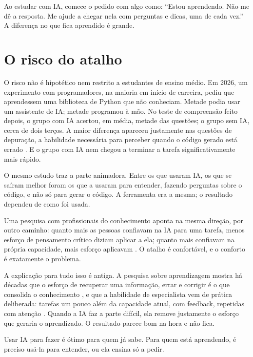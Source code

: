 \begin{dica}
Ao estudar com IA, comece o pedido com algo como: \enquote{Estou aprendendo. Não me dê a
resposta. Me ajude a chegar nela com perguntas e dicas, uma de cada vez.} A diferença no
que fica aprendido é grande.
\end{dica}

\section{O risco do atalho}
\label{sec:risco-atalho}

O risco não é hipotético nem restrito a estudantes de ensino médio. Em 2026, um experimento
com programadores, na maioria em início de carreira, pediu que aprendessem uma biblioteca de
Python que não conheciam. Metade podia usar um assistente de IA; metade programou à mão. No
teste de compreensão feito depois, o grupo com IA acertou, em média, metade das questões;
o grupo sem IA, cerca de dois terços. A maior diferença apareceu justamente nas questões de
depuração, a habilidade necessária para perceber quando o código gerado está errado
\parencite{shen2026}. E o grupo com IA nem chegou a terminar a tarefa significativamente
mais rápido.

O mesmo estudo traz a parte animadora. Entre os que usaram IA, os que se saíram melhor
foram os que a usaram para entender, fazendo perguntas sobre o código, e não só para gerar
o código. A ferramenta era a mesma; o resultado dependeu de como foi usada.

Uma pesquisa com profissionais do conhecimento aponta na mesma direção, por outro caminho:
quanto mais as pessoas confiavam na IA para uma tarefa, menos esforço de pensamento crítico
diziam aplicar a ela; quanto mais confiavam na própria capacidade, mais esforço aplicavam
\parencite{lee2025}. O atalho é confortável, e o conforto é exatamente o problema.

A explicação para tudo isso é antiga. A pesquisa sobre aprendizagem mostra há décadas que
o esforço de recuperar uma informação, errar e corrigir é o que consolida o conhecimento
\parencite{bjork1994}, e que a habilidade de especialista vem de prática deliberada: tarefas
um pouco além da capacidade atual, com feedback, repetidas com atenção
\parencite{ericsson1993}. Quando a IA faz a parte difícil, ela remove justamente o esforço
que geraria o aprendizado. O resultado parece bom na hora e não fica.

\begin{destaque}
Usar IA para fazer é ótimo para quem já sabe. Para quem está aprendendo, é preciso usá-la
para entender, ou ela ensina só a pedir.
\end{destaque}

